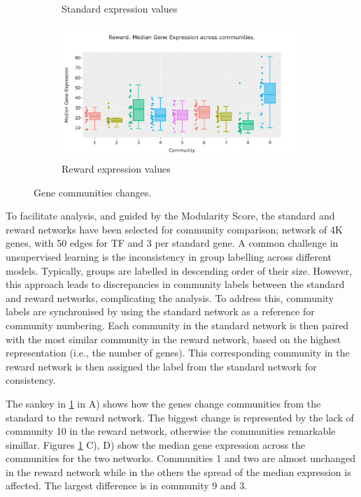 \begin{figure}[!htb]
\begin{subfigure}[b]{0.47\textwidth}
        \caption{Standard expression values}
    \end{subfigure}
    \hfill
    \begin{subfigure}[b]{0.47\textwidth}
        \centering
        \includegraphics[width=\textwidth,keepaspectratio]{Sections/Network_I/Resources/P0/Comms/P0_norm3_4K_50TF_med.png}
        \caption{Reward expression values}
    \end{subfigure}
    \hfill
    \caption{Gene communities changes.}
    \label{fig:N_I:p0_comm_chgs}
\end{figure}


To facilitate analysis, and guided by the Modularity Score, the standard and reward networks have been selected for community comparison; network of 4K genes, with 50 edges for TF and 3 per standard gene. A common challenge in unsupervised learning is the inconsistency in group labelling across different models. Typically, groups are labelled in descending order of their size. However, this approach leads to discrepancies in community labels between the standard and reward networks, complicating the analysis. To address this, community labels are synchronised by using the standard network as a reference for community numbering. Each community in the standard network is then paired with the most similar community in the reward network, based on the highest representation (i.e., the number of genes). This corresponding community in the reward network is then assigned the label from the standard network for consistency.

The sankey in \cref{fig:N_I:p0_comm_chgs} in A) shows 
how the genes change communities from the standard to the reward network. The biggest change is represented by the lack of community 10 in the reward network, otherwise the communities remarkable simillar. Figures \ref{fig:N_I:p0_comm_chgs} C), D) show the median gene expression across the communities for the two networks. Communities 1 and two are almost unchanged in the reward network while in the others the spread of the median expression is affected. The largest difference is in community 9 and 3.  

